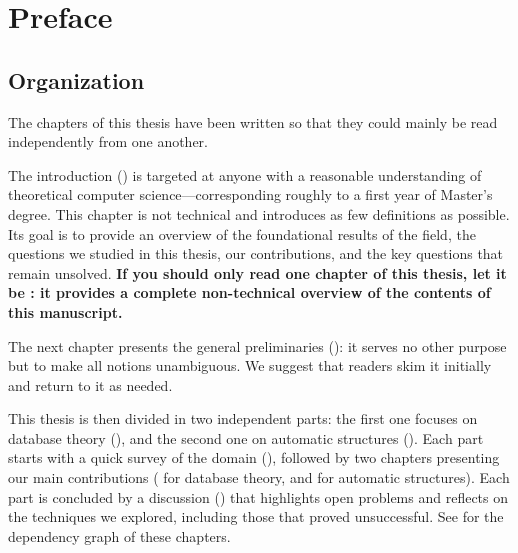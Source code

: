 \chapter*{Preface}

\section*{Organization}

The chapters of this thesis have been written so that they could mainly
be read independently from one another.

The introduction () is targeted at anyone with
a reasonable understanding of theoretical computer science---corresponding roughly
to a first year of Master’s degree. This chapter is not technical and introduces as few definitions
as possible. Its goal is to provide an overview of the foundational results of the
field, the questions we studied in this thesis, our contributions,
and the key questions that remain unsolved.
\textbf{If you should only read one chapter of this thesis, let it be :
it provides a complete non-technical overview of the contents of this manuscript.}

The next chapter presents the general preliminaries ():
it serves no other purpose but to make all notions unambiguous.
We suggest that readers skim it initially and return to it as needed.

This thesis is then divided in two independent parts:
the first one focuses on database theory (),
and the second one on automatic structures ().
Each part starts with a quick survey of the domain
(),
followed by two chapters presenting our main contributions
( for database theory,
and  for automatic structures).
Each part is concluded by a discussion () that highlights open problems and reflects on the techniques we explored, including those that proved unsuccessful.
See  for the dependency graph of these chapters.

